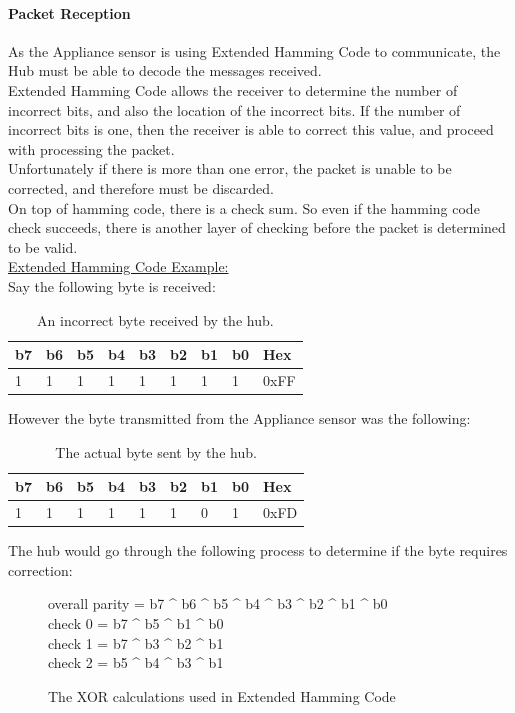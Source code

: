 \documentclass[draft,preprint,12pt,3p]{elsarticle}
\begin{document}
\paragraph{Packet Reception}
As the Appliance sensor is using Extended Hamming Code to communicate, the Hub must be able to decode the messages received.\\
Extended Hamming Code allows the receiver to determine the number of incorrect bits, and also the location of the incorrect bits. If the number of incorrect bits is one, then the receiver is able to correct this value, and proceed with processing the packet.\\
Unfortunately if there is more than one error, the packet is unable to be corrected, and therefore must be discarded.\\
On top of hamming code, there is a check sum. So even if the hamming code check succeeds, there is another layer of checking before the packet is determined to be valid.\\[5pt]
\underline{Extended Hamming Code Example:}\\[5pt]
Say the following byte is received:
\begin{table}[H]
\centering
\begin{tabular}{| l | l | l | l | l | l | l | l | l |}
\hline
b7 & b6 & b5 & b4 & b3 & b2 & b1 & b0 & Hex\\ \hline
1 & 1 & 1 & 1 & 1 & 1 & 1 & 1 & 0xFF\\ \hline
\end{tabular}
\caption{An incorrect byte received by the hub.}
\label{tab:incorrectpacket}
\end{table}

However the byte transmitted from the Appliance sensor was the following:
\begin{table}[H]
\centering
\begin{tabular}{| l | l | l | l | l | l | l | l | l |}
\hline
b7 & b6 & b5 & b4 & b3 & b2 & b1 & b0 & Hex\\ \hline
1 & 1 & 1 & 1 & 1 & 1 & 0 & 1  & 0xFD\\ \hline
\end{tabular}
\caption{The actual byte sent by the hub.}
\label{tab:correctpacket}
\end{table}

The hub would go through the following process to determine if the byte requires correction:\\
\begin{figure}[H]
\centering
overall parity = b7 \^{} b6 \^{} b5 \^{} b4 \^{} b3 \^{} b2 \^{} b1 \^{} b0\\
check 0 = b7 \^{} b5 \^{} b1 \^{} b0\\
check 1 = b7 \^{} b3 \^{} b2 \^{} b1\\
check 2 = b5 \^{} b4 \^{} b3 \^{} b1\\
\caption{The XOR calculations used in Extended Hamming Code~\cite{extendedhamming}}
\label{fig:xorcalcs}
\end{figure}
\end{document}
